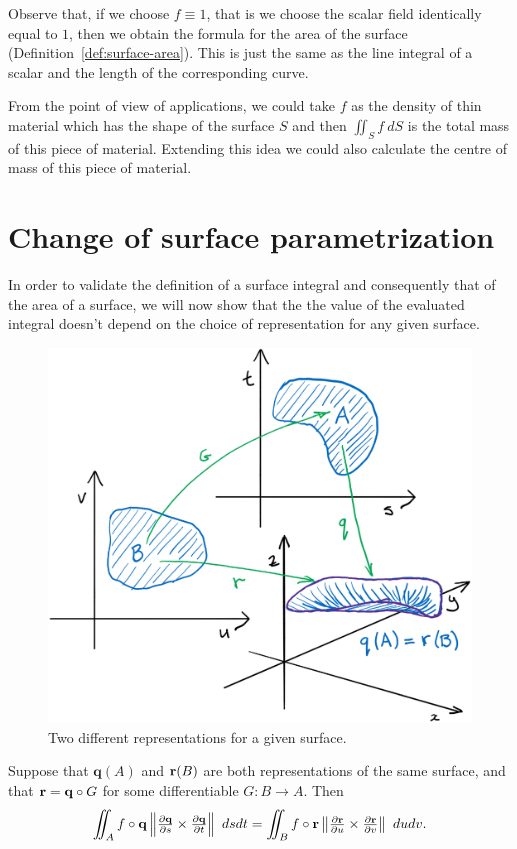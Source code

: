 Observe that, if we choose \(f\equiv 1\), that is we choose the scalar field identically equal to \(1\), then we obtain the formula for the area of the surface (Definition~\ref{def:surface-area}).
This is just the same as the line integral of a scalar and the length of the corresponding curve.

From the point of view of applications, we could take \(f\) as the density of thin material which has the shape of the surface \(S\) and then \(\iint_{S} f \ dS\) is the total mass of this piece of material.
Extending this idea we could also calculate the centre of mass of this piece of material.


\section{Change of surface parametrization}

In order to validate the definition of a surface integral and consequently that of the area of a surface, we will now show that the the value of the evaluated integral doesn't depend on the choice of representation for any given surface.

\begin{figure}
    \centering
    \includegraphics[width=.6\textwidth]{graphics/change-param}
    \caption{Two different representations for a given surface.}
\end{figure}

\begin{theorem}
    Suppose that     \(\mathbf{q}(A)\) and \(\mathbf{r}(B)\) are both representations of the same surface,
    and that     \(\mathbf{r} = \mathbf{q}\circ G\) for some differentiable \(G:B\to A\).
    Then
    \[
        \iint_{A} f \circ \mathbf{q}  \left\|\tfrac{\partial  \mathbf{q} }{\partial s} \times \tfrac{\partial  \mathbf{q} }{\partial t}\right\| \ ds dt
        =
        \iint_{B} f \circ \mathbf{r}  \left\|\tfrac{\partial  \mathbf{r} }{\partial u} \times \tfrac{\partial  \mathbf{r} }{\partial v}\right\| \ du dv.
    \]
\end{theorem}

